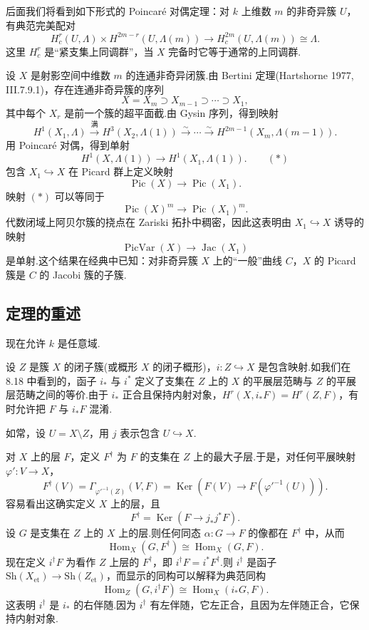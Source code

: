 \begin{aside}\label{asd:16.5}
后面我们将看到如下形式的 Poincar\'e 对偶定理：对 $k$ 上维数 $m$ 的非奇异簇 $U$，有典范完美配对
\[
H^{r}_{c}(U, \Lambda) \times H^{2m-r}(U, \Lambda(m)) \to H^{2m}_{c}(U, \Lambda(m)) \cong \Lambda.
\]
这里 $H^{r}_{c}$ 是``紧支集上同调群''，当 $X$ 完备时它等于通常的上同调群.
\end{aside}

\begin{example}\label{ex:16.6}
设 $X$ 是射影空间中维数 $m$ 的连通非奇异闭簇.由 Bertini 定理(Hartshorne 1977, III.7.9.1)，存在连通非奇异簇的序列
\[
X = X_m \supset X_{m-1} \supset \cdots \supset X_1,
\]
其中每个 $X_r$ 是前一个簇的超平面截.由 Gysin 序列，得到映射
\[
H^{1}(X_1, \Lambda) \xrightarrow{\text{满}} H^{3}(X_2, \Lambda(1)) \xrightarrow{\sim} \cdots \xrightarrow{\sim} H^{2m-1}(X_m, \Lambda(m-1)).
\]
用 Poincar\'e 对偶，得到单射
\[
H^{1}(X, \Lambda(1)) \to H^{1}(X_1, \Lambda(1)). \qquad (*)
\]
包含 $X_1 \hookrightarrow X$ 在 Picard 群上定义映射
\[
\operatorname{Pic}(X) \to \operatorname{Pic}(X_1).
\]
映射 $(*)$ 可以等同于
\[
\operatorname{Pic}(X)^m \to \operatorname{Pic}(X_1)^m.
\]
代数闭域上阿贝尔簇的挠点在 Zariski 拓扑中稠密，因此这表明由 $X_1 \hookrightarrow X$ 诱导的映射
\[
\operatorname{PicVar}(X) \to \operatorname{Jac}(X_1)
\]
是单射.这个结果在经典中已知：对非奇异簇 $X$ 上的``一般''曲线 $C$，$X$ 的 Picard 簇是 $C$ 的 Jacobi 簇的子簇.
\end{example}

\subsection*{定理的重述}

现在允许 $k$ 是任意域.

设 $Z$ 是簇 $X$ 的闭子簇(或概形 $X$ 的闭子概形)，$i \colon Z \hookrightarrow X$ 是包含映射.如我们在 8.18 中看到的，函子 $i_{*}$ 与 $i^{*}$ 定义了支集在 $Z$ 上的 $X$ 的平展层范畴与 $Z$ 的平展层范畴之间的等价.由于 $i_{*}$ 正合且保持内射对象，$H^{r}(X, i_{*}F) = H^{r}(Z, F)$，有时允许把 $F$ 与 $i_{*}F$ 混淆.

如常，设 $U = X \setminus Z$，用 $j$ 表示包含 $U \hookrightarrow X$.

对 $X$ 上的层 $F$，定义 $F^{\dagger}$ 为 $F$ 的支集在 $Z$ 上的最大子层.于是，对任何平展映射 $\varphi' \colon V \to X$，
\[
F^{\dagger}(V) = \Gamma_{\varphi'^{-1}(Z)}(V, F) = \operatorname{Ker}(F(V) \to F(\varphi'^{-1}(U))).
\]
容易看出这确实定义 $X$ 上的层，且
\[
F^{\dagger} = \operatorname{Ker}(F \to j_{*}j^{*}F).
\]
设 $G$ 是支集在 $Z$ 上的 $X$ 上的层.则任何同态 $\alpha \colon G \to F$ 的像都在 $F^{\dagger}$ 中，从而
\[
\operatorname{Hom}_X(G, F^{\dagger}) \cong \operatorname{Hom}_X(G, F).
\]
现在定义 $i^{\dagger}F$ 为看作 $Z$ 上层的 $F^{\dagger}$，即 $i^{\dagger}F = i^{*}F^{\dagger}$.则 $i^{\dagger}$ 是函子 $\mathrm{Sh}(X_{\mathrm{et}}) \to \mathrm{Sh}(Z_{\mathrm{et}})$，而显示的同构可以解释为典范同构
\[
\operatorname{Hom}_Z(G, i^{\dagger}F) \cong \operatorname{Hom}_X(i_{*}G, F).
\]
这表明 $i^{\dagger}$ 是 $i_{*}$ 的右伴随.因为 $i^{\dagger}$ 有左伴随，它左正合，且因为左伴随正合，它保持内射对象.

